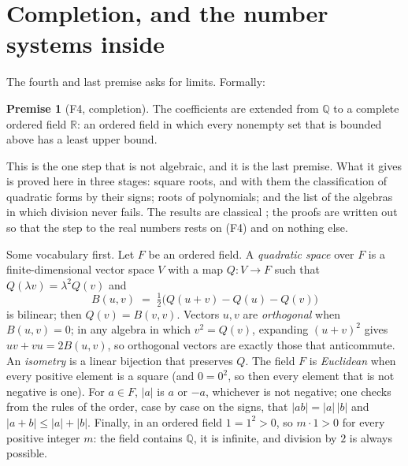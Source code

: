 \documentclass[11pt]{article}
\theoremstyle{plain}
\theoremstyle{definition}
\theoremstyle{plain}
\theoremstyle{definition}
\newtheorem*{premise}{Premise}
\newcommand{\R}{\mathbb{R}}
\newcommand{\Q}{\mathbb{Q}}
\begin{document}
\section{Completion, and the number systems inside}\label{sec:completion}

The fourth and last premise asks for limits. Formally:

\begin{premise}[F4, completion]
The coefficients are extended from $\Q$ to a complete ordered field $\R$: an ordered field in which every nonempty set that is bounded above has a least upper bound.
\end{premise}

This is the one step that is not algebraic, and it is the last premise. What it gives is proved here in three stages: square roots, and with them the classification of quadratic forms by their signs; roots of polynomials; and the list of the algebras in which division never fails. The results are classical \cite{Lam2005, Ebbinghaus1991}; the proofs are written out so that the step to the real numbers rests on (F4) and on nothing else.

Some vocabulary first. Let $F$ be an ordered field. A \emph{quadratic space} over $F$ is a finite-dimensional vector space $V$ with a map $Q : V \to F$ such that $Q(\lambda v) = \lambda^{2}Q(v)$ and
\[
B(u, v) \;=\; \tfrac12\bigl(Q(u + v) - Q(u) - Q(v)\bigr)
\]
is bilinear; then $Q(v) = B(v, v)$. Vectors $u, v$ are \emph{orthogonal} when $B(u,v) = 0$; in any algebra in which $v^{2} = Q(v)$, expanding $(u+v)^{2}$ gives $uv + vu = 2B(u,v)$, so orthogonal vectors are exactly those that anticommute. An \emph{isometry} is a linear bijection that preserves $Q$. The field $F$ is \emph{Euclidean} when every positive element is a square (and $0 = 0^{2}$, so then every element that is not negative is one). For $a \in F$, $|a|$ is $a$ or $-a$, whichever is not negative; one checks from the rules of the order, case by case on the signs, that $|ab| = |a|\,|b|$ and $|a + b| \leq |a| + |b|$. Finally, in an ordered field $1 = 1^{2} > 0$, so $m \cdot 1 > 0$ for every positive integer $m$: the field contains $\Q$, it is infinite, and division by $2$ is always possible.
\end{document}

